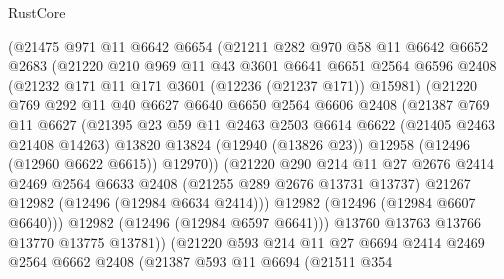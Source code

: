 \begin{lexlean}{RustCore}
\begin{coremodule}
            (@21475
              @971
              @11
              @6642
              @6654
              (@21211
                @282
                @970
                @58
                @11
                @6642
                @6652
                @2683
                (@21220
                  @210
                  @969
                  @11
                  @43
                  @3601
                  @6641
                  @6651
                  @2564
                  @6596
                  @2408
                  (@21232 @171 @11 @171 @3601 (@12236 (@21237 @171)) @15981)
                  (@21220
                    @769
                    @292
                    @11
                    @40
                    @6627
                    @6640
                    @6650
                    @2564
                    @6606
                    @2408
                    (@21387
                      @769
                      @11
                      @6627
                      (@21395
                        @23
                        @59
                        @11
                        @2463
                        @2503
                        @6614
                        @6622
                        (@21405 @2463 @21408 @14263)
                        @13820
                        @13824
                        (@12940 (@13826 @23))
                        @12958
                        (@12496 (@12960 @6622 @6615))
                        @12970))
                    (@21220
                      @290
                      @214
                      @11
                      @27
                      @2676
                      @2414
                      @2469
                      @2564
                      @6633
                      @2408
                      (@21255 @289 @2676 @13731 @13737)
                      @21267
                      @12982
                      (@12496 (@12984 @6634 @2414)))
                    @12982
                    (@12496 (@12984 @6607 @6640)))
                  @12982
                  (@12496 (@12984 @6597 @6641)))
                @13760
                @13763
                @13766
                @13770
                @13775
                @13781))
            (@21220
              @593
              @214
              @11
              @27
              @6694
              @2414
              @2469
              @2564
              @6662
              @2408
              (@21387
                @593
                @11
                @6694
                (@21511
                  @354

\end{coremodule}
\end{lexlean}
